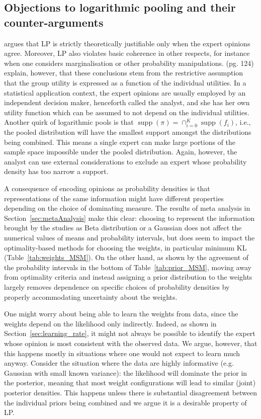 \documentclass[a4paper, notitlepage, 11pt]{article}
\DeclareMathOperator\supp{supp}
\begin{document}
\subsection{Objections to logarithmic pooling and their counter-arguments}

\cite{West1984} argues that LP is strictly theoretically justifiable only when the expert opinions agree.
Moreover, LP also violates basic coherence in other respects, for instance when one considers marginalisation or other probability manipulations. 
\cite{Genest1986B} (pg. 124) explain, however, that these conclusions stem from the restrictive assumption that the group utility is expressed as a function of the individual utilities.
In a statistical application context, the expert opinions are usually employed by an independent decision maker, henceforth called the analyst, and she has her own utility function which can be assumed to not depend on the individual utilities.
Another quirk of logarithmic pools is that $\supp(\pi) = \cap_{i=0}^K \supp(f_i)$, i.e., the pooled distribution will have the smallest support amongst the distributions being combined.
This means a single expert can make large portions of the sample space impossible under the pooled distribution.
Again, however, the analyst can use external considerations to exclude an expert whose probability density has too narrow a support.

A consequence of encoding opinions as probability densities is that representations of the same information might have different properties depending on the choice of dominating measure.
The results of meta analysis in Section~\ref{sec:metaAnalysis} make this clear: choosing to represent the information brought by the studies as Beta distribution or a Gaussian does not affect the numerical values of means and probability intervals, but does seem to impact the optimality-based methods for choosing the weights, in particular minimum KL  (Table~\ref{tab:weights_MSM}).
On the other hand, as shown by the agreement of the probability intervals in the bottom of Table~\ref{tab:prior_MSM}, moving away from optimality criteria and instead assigning a prior distribution to the weights largely removes dependence on specific choices of probability densities by properly accommodating uncertainty about the weights.

One might worry about being able to learn the weights from data, since the weights depend on the likelihood only indirectly.
Indeed, as shown in Section~\ref{sec:learning_rate}, it might not always be possible to identify the expert whose opinion is most consistent with the observed data.
We argue, however, that this happens mostly in situations where one would not expect to learn much anyway.
Consider the situation where the data are highly informative (e.g. Gaussian with small known variance): the likelihood will dominate the prior in the posterior, meaning that most weight configurations will lead to similar (joint) posterior densities.
This happens unless there is substantial disagreement between the individual priors being combined and we argue it is a desirable property of LP.
\end{document}
